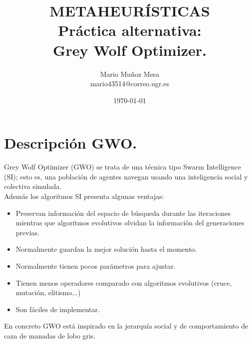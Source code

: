 \documentclass[11pt,a4paper]{article}
\title{
\normalfont \normalsize 
\textsc{\small METAHEURÍSTICAS} \\ [10pt]
	
	
\huge{\textbf{Práctica alternativa:} \\ \textbf{Grey Wolf Optimizer.}}\\

	}
\author{Mario Muñoz Mesa\\ mario43514@correo.ugr.es}
\date{\today}
\theoremstyle{definition}
\begin{document}
	\maketitle
	\newpage
	\renewcommand*\contentsname{Índice}	
	\tableofcontents
	
	\newpage
	
	\section{Descripción GWO.}
	Grey Wolf Optimizer (GWO) se trata de una técnica tipo Swarm Intelligence (SI); esto es, una población de agentes navegan usando una inteligencia social y colectiva simulada. \\
	
	Además los algoritmos SI presenta algunas ventajas:
	\begin{itemize}
		\item Preservan información del espacio de búsqueda durante las iteraciones mientras que algoritmos evolutivos olvidan la información del generaciones previas.
		\item Normalmente guardan la mejor solución hasta el momento.
		\item Normalmente tienen pocos parámetros para ajustar.
		\item Tienen menos operadores comparado con algoritmos evolutivos (cruce, mutación, elitismo...)
		
		\item Son fáciles de implementar.
	\end{itemize}

	En concreto GWO está inspirado en la jerarquía social y de comportamiento de caza de manadas de lobo gris.
	
\end{document}
